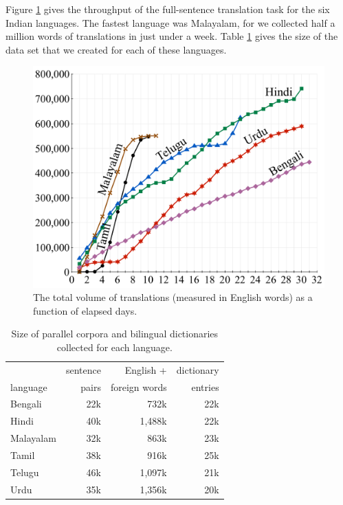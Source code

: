 \documentclass[11pt]{article}
\begin{document}
Figure \ref{figure:volume-of-data-by-language} gives the throughput of the full-sentence translation task for the six Indian languages.  The fastest language was Malayalam, for we collected half a million words of translations in just under a week.  Table \ref{table:data-size} gives the size of the data set that we created for each of these languages. 

\begin{figure}[t]
  \includegraphics[width=\linewidth]{figures/volume}
  \caption{The total volume of translations (measured in English words)
    as a function of elapsed days. }
  \label{figure:volume-of-data-by-language}
\end{figure}





\begin{table}[t]
  \centering
  \small
  \begin{tabular}{l|rrr}
    		 & sentence   &  English + & dictionary  \\
    language &  pairs  & foreign words &  entries \\
    \hline\hline
    Bengali & 22k & 732k   & 22k \\
    Hindi   &  40k & 1,488k & 22k \\
    Malayalam & 32k & 863k & 23k \\
    Tamil & 38k & 916k & 25k \\
    Telugu & 46k & 1,097k & 21k \\
    Urdu & 35k & 1,356k & 20k \\
  \end{tabular}
  \caption{Size of parallel corpora and bilingual dictionaries collected for each language. }
  \label{table:data-size}
\end{table}
\end{document}
